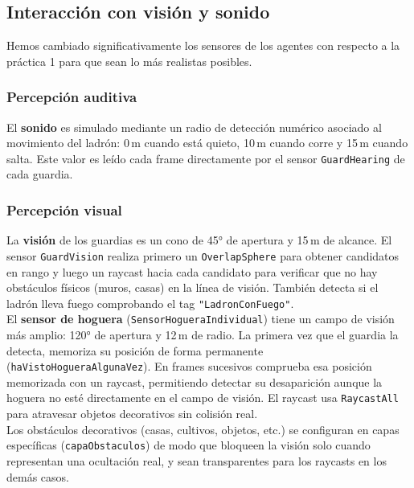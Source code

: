 \documentclass[a4paper,12pt]{article}
\begin{document}
\subsection{Interacción con visión y sonido}

Hemos cambiado significativamente los sensores de los agentes con respecto a la práctica 1 para que sean lo más realistas posibles. 

\subsubsection{Percepción auditiva}

El \textbf{sonido} es simulado mediante un radio de detección
numérico asociado al movimiento del ladrón: 0\,m cuando está quieto,
10\,m cuando corre y 15\,m cuando salta. Este valor es leído cada frame
directamente por el sensor \texttt{GuardHearing} de cada guardia.

\subsubsection{Percepción visual}

La \textbf{visión} de los guardias es un cono de 45° de apertura y
15\,m de alcance. El sensor \texttt{GuardVision} realiza primero un
\texttt{OverlapSphere} para obtener candidatos en rango y luego un
raycast hacia cada candidato para verificar que no hay obstáculos físicos
(muros, casas) en la línea de visión. También detecta si el ladrón lleva
fuego comprobando el tag \texttt{"LadronConFuego"}.\\

El \textbf{sensor de hoguera} (\texttt{SensorHogueraIndividual})
tiene un campo de visión más amplio: 120° de apertura y 12\,m de radio.
La primera vez que el guardia la detecta, memoriza su posición de forma
permanente \\(\texttt{haVistoHogueraAlgunaVez}). En frames sucesivos
comprueba esa posición memorizada con un raycast, permitiendo detectar
su desaparición aunque la hoguera no esté directamente en el campo de
visión. El raycast usa \texttt{RaycastAll} para atravesar objetos
decorativos sin colisión real.\\

Los obstáculos decorativos (casas, cultivos, objetos, etc.) se
configuran en capas específicas (\texttt{capaObstaculos}) de modo que
bloqueen la visión solo cuando representan una ocultación real, y sean
transparentes para los raycasts en los demás casos.
\end{document}
